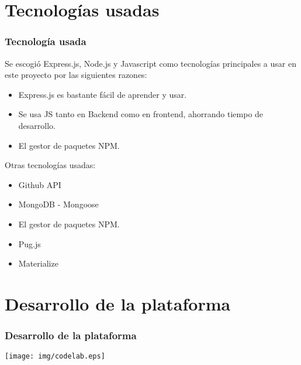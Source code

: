 \documentclass{beamer}
\begin{document}

\section{Tecnologías usadas}
\begin{frame}
  \frametitle{Tecnología usada}
  
  Se escogió Express.js, Node.js y Javascript como tecnologías principales a usar en este proyecto 
  por las siguientes razones:

  \begin{itemize}
    \item Express.js es bastante fácil de aprender y usar.
    \item Se usa JS tanto en Backend como en frontend, ahorrando tiempo de desarrollo.
    \item El gestor de paquetes NPM.
  \end{itemize}

  \framebreak

  Otras tecnologías usadas:

  \begin{itemize}
    \item Github API
    \item MongoDB - Mongoose
    \item El gestor de paquetes NPM.
    \item Pug.js
    \item Materialize
  \end{itemize}

\end{frame}


\section{Desarrollo de la plataforma}
\begin{frame}
\frametitle{Desarrollo de la plataforma}
  
  \begin{center}
    \texttt{[image: img/codelab.eps]}
  \end{center}

\end{frame}
\end{document}
